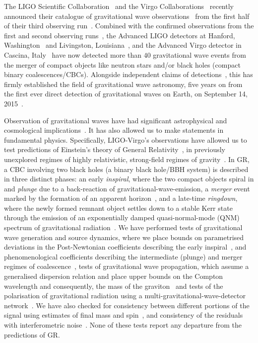 \documentclass[twocolumn,prd,superscriptaddress,amsfonts,amssymb,amsmath,preprintnumbers]{revtex4-1}
\begin{document}
The LIGO Scientific Collaboration~\citep{LSC} and the Virgo Collaborations~\citep{Virgo} recently announced their catalogue of gravitational wave observations~\citep{GWTC-2} from the first half of their third observing run~\citep{O3reference}. Combined with the confirmed observations from the first and second observing runs~\citep{GWTC-1}, the Advanced LIGO detectors at Hanford, Washington~\citep{technicaldocument_AdL_H} and Livingston, Louisiana~\citep{technicaldocument_AdL_L}, and the Advanced Virgo detector in Cascina, Italy~\citep{technicaldocument_V} have now detected more than $40$ gravitational wave events from the merger of compact objects like neutron stars and/or black holes (compact binary coalescences/CBCs). Alongside independent claims of detections~\citep{Nitz,IAS}, this has firmly established the field of gravitational wave astronomy, five years on from the first ever direct detection of gravitational waves on Earth, on September 14, 2015~\citep{GW150914det}. 
\par
Observation of gravitational waves have had significant astrophysical and cosmological implications~\citep{LVC:astropapers,H0paper}. It has also allowed us to make statements in fundamental physics. Specifically, LIGO-Virgo's observations have allowed us to test predictions of Einstein's theory of General Relativity~\citep[GR]{}, in previously unexplored regimes of highly relativistic, strong-field regimes of gravity~\citep{GW150914TGR,GW170817TGR,GWTC-1TGR}. In GR, a CBC involving two black holes (a binary black hole/BBH system) is described in three distinct phases: an early \textit{inspiral}, where the two compact objects spiral in and \textit{plunge} due to a back-reaction of gravitational-wave-emission, a \textit{merger} event marked by the formation of an apparent horizon~\citep{NRpaper}, and a late-time \textit{ringdown}, where the newly formed remnant object settles down to a stable Kerr state through the emission of an exponentially damped quasi-normal-mode (QNM) spectrum of gravitational radiation~\citep{vishu,earlyqnmpapers}.  We have performed tests of gravitational wave generation and source dynamics, where we place bounds on parametrised deviations in the Post-Newtonian coefficients describing the early inspiral~\citep{earlydevelopmentpapers}, and phenomenological coefficients describing the intermediate (plunge) and merger regimes of coalescence~\citep{TIGERmethodspapers}, tests of gravitational wave propagation, which assume a generalised dispersion relation and place upper bounds on the Compton wavelength and consequently, the mass of the graviton~\citep{GW170104det,samajdaretal} and tests of the polarisation of gravitational radiation using a multi-gravitational-wave-detector network~\citep{GW170814det,isietal}. We have also checked for consistency between different portions of the signal using estimates of final mass and spin~\citep{IMRCTpapers}, and consistency of the residuals with interferometric noise~\citep{sudarshanetal,GWTC-1TGR}. None of these tests report any departure from the predictions of GR.
\end{document}
